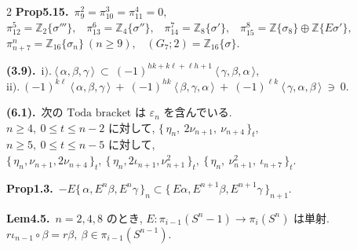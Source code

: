\documentclass[10pt, leqno]{ltjsarticle}
\newcommand{\todai}[2][]{\{\,#2\,\}_{#1}}      %
\newcommand{\todas}[1]{\langle\,#1\,\rangle}
\newcommand{\gen}[1]{\{#1\}}       %
\newcommand{\pis}[2]{\pi_{#1}(#2)}       %
\numberwithin{equation}{section}
\theoremstyle{plain}
\theoremstyle{definition}
\theoremstyle{remark}
\begin{document}
\begin{paracol}{2}
\noindent
\textbf{Prop5.15.}\
\(\pi_9^2=\pi_{10}^3=\pi_{11}^4=0,\) \\
\(\pi^{5}_{12}=\mathbb Z_2\gen{\sigma'''},\) \
\(\pi^{6}_{13}=\mathbb Z_4\gen{\sigma''},\) \
\(\pi^{7}_{14}=\mathbb Z_8\gen{\sigma'},\) \
\(\pi^{8}_{15}=\mathbb Z\gen{\sigma_8}\oplus\mathbb Z\gen{E\sigma'},\) \\
\(\pi^{n}_{n+7}=\mathbb Z_{16}\gen{\sigma_n}\ (n\ge9),\) \
\((G_{7};2)=\mathbb Z_{16}\gen{\sigma}.\)

\noindent
\textbf{(3.9).}\
\(\text{i).}\ \todas{\alpha,\beta,\gamma}\ \subset\
(-1)^{hk+k\ell+\ell h+1}\ \todas{\gamma,\beta,\alpha},\)\\
\(\text{ii).}\ (-1)^{k\ell}\ \todas{\alpha,\beta,\gamma}\ +\
(-1)^{hk}\ \todas{\beta,\gamma,\alpha}\ +\
(-1)^{\ell k}\ \todas{\gamma,\alpha,\beta}\ \ni\ 0 .\)

\noindent
\textbf{(6.1).}\ 
\(\text{次の Toda bracket は } \varepsilon_n \text{ を含んでいる. }\quad\)\\
\(n\ge4,\ 0\le t\le n-2\) に対して, 
\(
\todai[t]{\eta_n,\ 2\nu_{n+1},\ \nu_{n+4}},
\)\\
\(n\ge5,\ 0\le t\le n-5\) に対して, \\
\(
\todai[t]{\eta_n, \nu_{n+1}, 2\nu_{n+4}},\
\todai[t]{\eta_n, 2\iota_{n+1}, \nu_{n+1}^2},\
\todai[t]{\eta_n,\ \nu_{n+1}^{2},\ \iota_{n+7}} .
\)

\noindent
\textbf{Prop1.3.}\
\(-E\todai[n]{\alpha, E^n\beta, E^n\gamma}
\subset \todai[n+1]{E\alpha, E^{n+1}\beta, E^{n+1}\gamma}\).

\noindent
\textbf{Lem4.5.}\
\(n=2,4,8\) のとき, 
\(E:\pis{i-1}{S^n-1}\to\pis{i}{S^n}\) は単射.\\ 
\(r\iota_{n-1}\circ\beta = r\beta,\ \beta\in\pis{i-1}{S^{n-1}}\).







\end{paracol}
\end{document}
